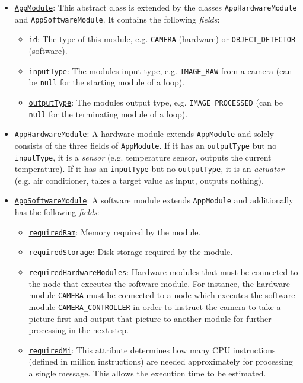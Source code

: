 \begin{itemize}
    \item \underline{\texttt{AppModule}}: This abstract class is extended by the classes \texttt{AppHardwareModule} and \texttt{AppSoftwareModule}. It contains the following \textit{fields}:
    \begin{itemize}
        \item \underline{\texttt{id}}: The type of this module, e.g. \texttt{CAMERA} (hardware) or \texttt{OBJECT\_DETECTOR} (software).
        \item \underline{\texttt{inputType}}: The modules input type, e.g. \texttt{IMAGE\_RAW} from a camera (can be \texttt{null} for the starting module of a loop).
        \item \underline{\texttt{outputType}}: The modules output type, e.g. \texttt{IMAGE\_PROCESSED} (can be \texttt{null} for the terminating module of a loop).
    \end{itemize}

    \item \underline{\texttt{AppHardwareModule}}: A hardware module extends \texttt{AppModule} and solely consists of the three fields of \texttt{AppModule}. If it has an \texttt{outputType} but no \texttt{inputType}, it is a \textit{sensor} (e.g. temperature sensor, outputs the current temperature). If it has an \texttt{inputType} but no \texttt{outputType}, it is an \textit{actuator} (e.g. air conditioner, takes a target value as input, outputs nothing).
    
    \item \underline{\texttt{AppSoftwareModule}}: A software module extends \texttt{AppModule} and additionally has the following \textit{fields}:
    \begin{itemize}
        \item \underline{\texttt{requiredRam}}: Memory required by the module.
        \item \underline{\texttt{requiredStorage}}: Disk storage required by the module.
        \item \underline{\texttt{requiredHardwareModules}}: Hardware modules that must be connected to the node that executes the software module. For instance, the hardware module \texttt{CAMERA} must be connected to a node which executes the software module \texttt{CAMERA\_CONTROLLER} in order to instruct the camera to take a picture first and output that picture to another module for further processing in the next step.
        \item \underline{\texttt{requiredMi}}: This attribute determines how many CPU instructions (defined in million instructions) are needed approximately for processing a single message. This allows the execution time to be estimated.
    \end{itemize}
    

\end{itemize}
